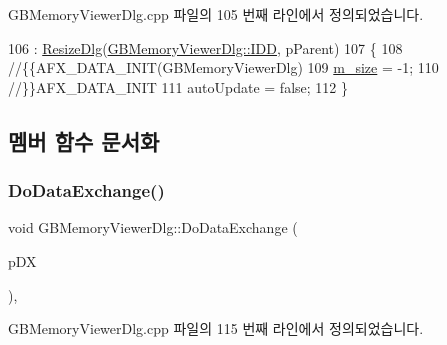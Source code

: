 G\+B\+Memory\+Viewer\+Dlg.\+cpp 파일의 105 번째 라인에서 정의되었습니다.


\begin{DoxyCode}
106   : \mbox{\hyperlink{class_resize_dlg_a87bab778e9312f274ebe750d4c3a67ee}{ResizeDlg}}(\mbox{\hyperlink{class_g_b_memory_viewer_dlg_a9817c54337df4c66ab82b7ea720879a2afc6cb593bc0443ee2b8bc010574cb6a5}{GBMemoryViewerDlg::IDD}}, pParent)
107 \{
108   \textcolor{comment}{//\{\{AFX\_DATA\_INIT(GBMemoryViewerDlg)}
109   \mbox{\hyperlink{class_g_b_memory_viewer_dlg_a9837ff346b59fb46c6b778a0adf8adf8}{m\_size}} = -1;
110   \textcolor{comment}{//\}\}AFX\_DATA\_INIT}
111   autoUpdate = \textcolor{keyword}{false};
112 \}
\end{DoxyCode}


\subsection{멤버 함수 문서화}
\mbox{\label{class_g_b_memory_viewer_dlg_a124868a573da84a7958c38409059bde3}} 
\subsubsection{\texorpdfstring{Do\+Data\+Exchange()}{DoDataExchange()}}
{\footnotesize\ttfamily void G\+B\+Memory\+Viewer\+Dlg\+::\+Do\+Data\+Exchange (\begin{DoxyParamCaption}\item[{C\+Data\+Exchange $\ast$}]{p\+DX }\end{DoxyParamCaption})\hspace{0.3cm}{\ttfamily [protected]}, {\ttfamily [virtual]}}



G\+B\+Memory\+Viewer\+Dlg.\+cpp 파일의 115 번째 라인에서 정의되었습니다.


